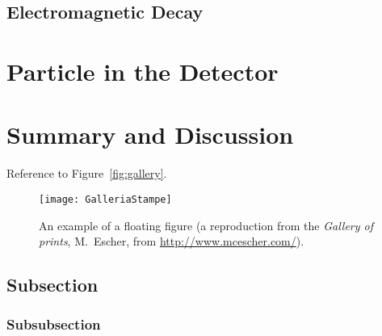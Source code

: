 \documentclass[
10pt, %
a4paper, %
oneside, %
headinclude,footinclude, %
BCOR5mm, %
]{scrartcl}
\begin{document}
\subsection{Electromagnetic Decay}


\section{Particle in the Detector}



\section{Summary and Discussion}

Reference to Figure~\vref{fig:gallery}. %

\begin{figure}[tb]
\centering 
\texttt{[image: GalleriaStampe]} 
\caption[An example of a floating figure]{An example of a floating figure (a reproduction from the \emph{Gallery of prints}, M.~Escher, from \url{http://www.mcescher.com/}).} %
\label{fig:gallery} 
\end{figure}

\lipsum[10] %


\subsection{Subsection}

\lipsum[11] %

\subsubsection{Subsubsection}

\lipsum[12] %
\end{document}
